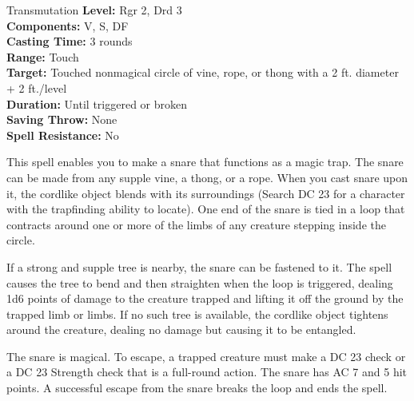 {Transmutation}
{
	\textbf{Level:}
	Rgr 2, Drd 3\\
	\textbf{Components:}
	V, S, DF\\
	\textbf{Casting Time:}
	3 rounds\\
	\textbf{Range:}
	Touch\\
	\textbf{Target:}
	Touched nonmagical circle of vine, rope, or thong with a 2 ft. diameter + 2 ft./level\\
	\textbf{Duration:}
	Until triggered or broken\\
	\textbf{Saving Throw:}
	None\\
	\textbf{Spell Resistance:}
	No\\
}
{
	This spell enables you to make a snare that functions as a magic trap. The snare can be made from any supple vine, a thong, or a rope. When you cast snare upon it, the cordlike object blends with its surroundings (Search DC 23 for a character with the trapfinding ability to locate). One end of the snare is tied in a loop that contracts around one or more of the limbs of any creature stepping inside the circle.

	If a strong and supple tree is nearby, the snare can be fastened to it. The spell causes the tree to bend and then straighten when the loop is triggered, dealing 1d6 points of damage to the creature trapped and lifting it off the ground by the trapped limb or limbs. If no such tree is available, the cordlike object tightens around the creature, dealing no damage but causing it to be entangled.

	The snare is magical. To escape, a trapped creature must make a DC 23  check or a DC 23 Strength check that is a full-round action. The snare has AC 7 and 5 hit points. A successful escape from the snare breaks the loop and ends the spell.

}
